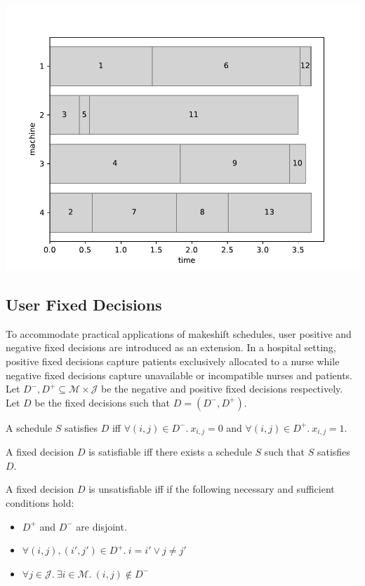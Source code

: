\begin{center}
	\includegraphics[width=.6\linewidth]{figures/makeshift2.pdf}	
\end{center}

\subsection{User Fixed Decisions}

To accommodate practical applications of makeshift schedules, user positive and negative fixed decisions are introduced as an extension. In a hospital setting, positive fixed decisions capture patients exclusively allocated to a nurse while negative fixed decisions capture unavailable or incompatible nurses and patients. Let $D^-,D^+\subseteq\mathcal{M}\times\mathcal{J}$ be the negative and positive fixed decisions respectively. Let $D$ be the fixed decisions such that $D=(D^-,D^+)$.

\begin{definition}
	A schedule $S$ satisfies $D$ iff $\forall(i,j)\in D^-.\ x_{i,j}=0$ and $\forall (i,j)\in D^+.\ x_{i,j}=1$.
\end{definition}

\begin{definition}
	A fixed decision $D$ is satisfiable iff there exists a schedule $S$ such that $S$ satisfies $D$. 
\end{definition}

\begin{theorem}
	A fixed decision $D$ is unsatisfiable iff if the following necessary and sufficient conditions hold:
	\begin{itemize}
		\item$D^+$ and $D^-$ are disjoint.
		\item$\forall(i,j),(i',j')\in D^+.\ i=i'\lor j\neq j'$
		\item$\forall j\in\mathcal{J}.\ \exists i\in\mathcal{M}.\ (i,j)\not\in D^-$
	\end{itemize}
\end{theorem}

